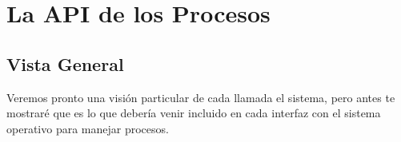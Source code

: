 \documentclass[12pt, fleqn]{report}                             %
\begin{document}
        \clearpage
        \section{La API de los Procesos}

            \subsection{Vista General}

                Veremos pronto una visión particular de cada llamada el sistema, pero 
                antes te mostraré que es lo que debería venir incluido en cada interfaz
                con el sistema operativo para manejar procesos.
\end{document}
